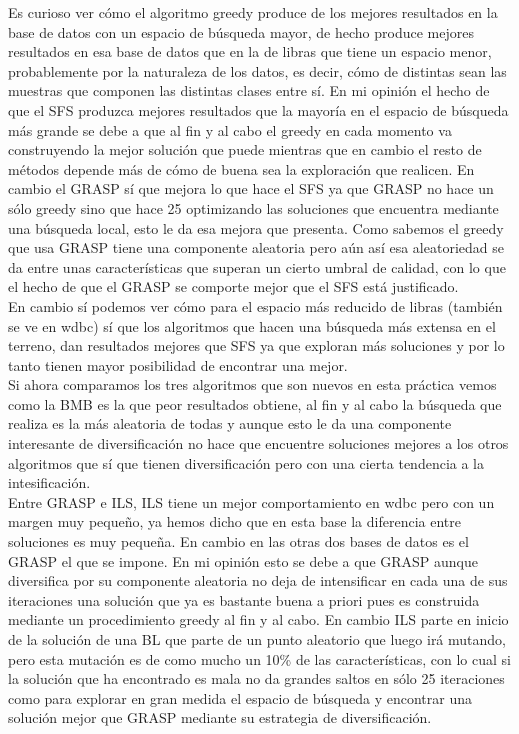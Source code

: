 \documentclass[10pt,a4paper]{article}
\begin{document}
Es curioso ver cómo el algoritmo greedy produce de los mejores resultados en la base de datos con un espacio de búsqueda mayor, de hecho produce mejores resultados en esa base de datos que en la de libras que tiene un espacio menor, probablemente por la naturaleza de los datos, es decir, cómo de distintas sean las muestras que componen las distintas clases entre sí. En mi opinión el hecho de que el SFS produzca mejores resultados que la mayoría en el espacio de búsqueda más grande se debe a que al fin y al cabo el greedy en cada momento va construyendo la mejor solución que puede mientras que en cambio el resto de métodos depende más de cómo de buena sea la exploración que realicen. En cambio el GRASP sí que mejora lo que hace el SFS ya que GRASP no hace un sólo greedy sino que hace 25 optimizando las soluciones que encuentra mediante una búsqueda local, esto le da esa mejora que presenta. Como sabemos el greedy que usa GRASP tiene una componente aleatoria pero aún así esa aleatoriedad se da entre unas características que superan un cierto umbral de calidad, con lo que el hecho de que el GRASP se comporte mejor que el SFS está justificado.\\

En cambio sí podemos ver cómo para el espacio más reducido de libras (también se ve en wdbc) sí que los algoritmos que hacen una búsqueda más extensa en el terreno, dan resultados mejores que SFS ya que exploran más soluciones y por lo tanto tienen mayor posibilidad de encontrar una mejor.\\

Si ahora comparamos los tres algoritmos que son nuevos en esta práctica vemos como la BMB es la que peor resultados obtiene, al fin y al cabo la búsqueda que realiza es la más aleatoria de todas y aunque esto le da una componente interesante de diversificación no hace que encuentre soluciones mejores a los otros algoritmos que sí que tienen diversificación pero con una cierta tendencia a la intesificación.\\

Entre GRASP e ILS, ILS tiene un mejor comportamiento en wdbc pero con un margen muy pequeño, ya hemos dicho que en esta base la diferencia entre soluciones es muy pequeña. En cambio en las otras dos bases de datos es el GRASP el que se impone. En mi opinión esto se debe a que GRASP aunque diversifica por su componente aleatoria no deja de intensificar en cada una de sus iteraciones una solución que ya es bastante buena a priori pues es construida mediante un procedimiento greedy al fin y al cabo. En cambio ILS parte en inicio de la solución de una BL que parte de un punto aleatorio que luego irá mutando, pero esta mutación es de como mucho un 10\% de las características, con lo cual si la solución que ha encontrado es mala no da grandes saltos en sólo 25 iteraciones como para explorar en gran medida el espacio de búsqueda y encontrar una solución mejor que GRASP mediante su estrategia de diversificación.\\
\end{document}
